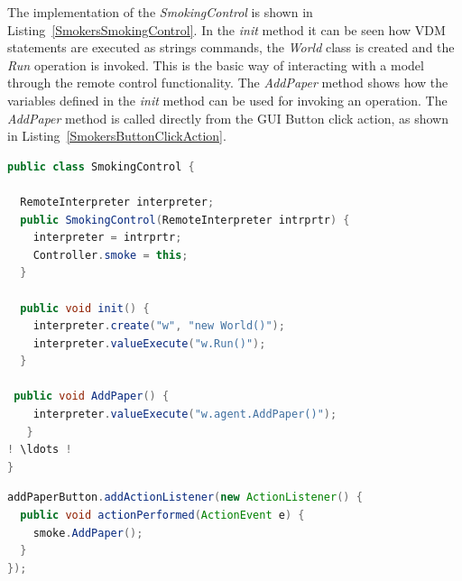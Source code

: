 \documentclass{overturerepchap}
\begin{document}
The implementation of the \textit{SmokingControl} is shown in Listing~\ref{SmokersSmokingControl}. In the \textit{init} method it can be seen how VDM statements are executed as strings commands, the \textit{World} class is created and the \textit{Run} operation is invoked.  This is the basic way of interacting with a model through the remote control functionality. The \textit{AddPaper} method shows how the variables defined in the \textit{init} method can be used for invoking an operation. The \textit{AddPaper} method is called directly from the GUI Button click action, as shown in Listing~\ref{SmokersButtonClickAction}.

\begin{lstlisting}[language=Java,label=SmokersSmokingControl,caption=Java implementation of the bridge between the GUI and the interpreter executing the VDM model, captionpos=b]
public class SmokingControl {
  
  RemoteInterpreter interpreter;
  public SmokingControl(RemoteInterpreter intrprtr) {
    interpreter = intrprtr;
    Controller.smoke = this;
  }
  	
  public void init() {
    interpreter.create("w", "new World()");	
    interpreter.valueExecute("w.Run()");
  }

 public void AddPaper() {
    interpreter.valueExecute("w.agent.AddPaper()");
   }
! \ldots !
}
\end{lstlisting}

\begin{lstlisting}[language=Java,label=SmokersButtonClickAction,caption=Java implementation of the Button click action invoking the remote intepreter, captionpos=b]
addPaperButton.addActionListener(new ActionListener() {
  public void actionPerformed(ActionEvent e) {	
    smoke.AddPaper();
  }
});	
\end{lstlisting}
\end{document}
